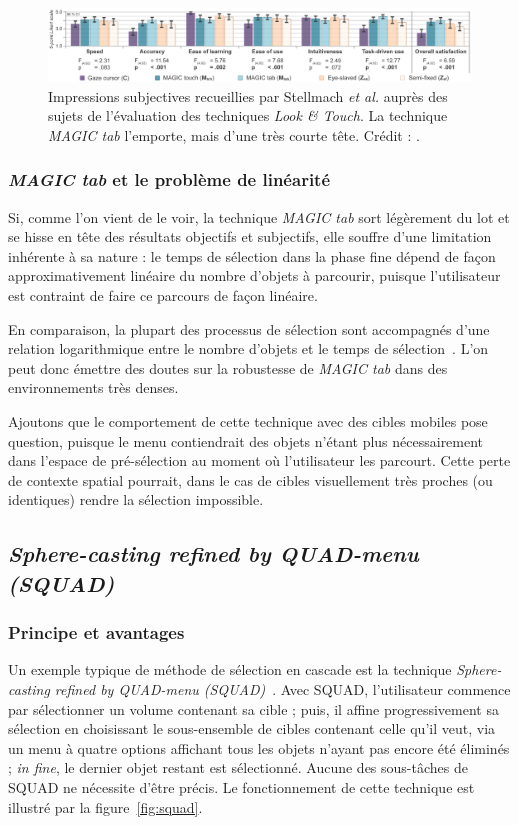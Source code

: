 	\begin{figure}[htb]
		\centering
		\includegraphics[width=\textwidth]{figures/ch2/latSubj}
		\caption[\emph{Look \&{} Touch -- impressions subjectives}]{Impressions subjectives recueillies par Stellmach \emph{et al.} auprès des sujets de l'évaluation des techniques \emph{Look \&{} Touch}. La technique \emph{MAGIC tab} l'emporte, mais d'une très courte tête. Crédit : \cite{stellmach2012look}.}
		\label{fig:latSubj}
	\end{figure}
	
	\subsubsection{\emph{MAGIC tab} et le problème de linéarité}
	Si, comme l'on vient de le voir, la technique \emph{MAGIC tab} sort légèrement du lot et se hisse en tête des résultats objectifs et subjectifs, elle souffre d'une limitation inhérente à sa nature : le temps de sélection dans la phase fine dépend de façon approximativement linéaire du nombre d'objets à parcourir, puisque l'utilisateur est contraint de faire ce parcours de façon linéaire.
	
	En comparaison, la plupart des processus de sélection sont accompagnés d'une relation logarithmique entre le nombre d'objets et le temps de sélection~\cite{hick1952rate, hyman1953stimulus}. L'on peut donc émettre des doutes sur la robustesse de \emph{MAGIC tab} dans des environnements très denses.
	
	Ajoutons que le comportement de cette technique avec des cibles mobiles pose question, puisque le menu contiendrait des objets n'étant plus nécessairement dans l'espace de pré-sélection au moment où l'utilisateur les parcourt. Cette perte de contexte spatial pourrait, dans le cas de cibles visuellement très proches (ou identiques) rendre la sélection impossible.
	
	\subsection{\emph{Sphere-casting refined by QUAD-menu
(SQUAD)}}
	\subsubsection{Principe et avantages}
	Un exemple typique de méthode de sélection en cascade est la technique \emph{Sphere-casting refined by QUAD-menu
(SQUAD)}~\cite{kopper2011rapid}. Avec SQUAD, l'utilisateur commence par sélectionner un volume contenant sa cible ; puis, il affine progressivement sa sélection en choisissant le sous-ensemble de cibles contenant celle qu'il veut, via un menu à quatre options affichant tous les objets n'ayant pas encore été éliminés ; \emph{in fine}, le dernier objet restant est sélectionné. Aucune des sous-tâches de SQUAD ne nécessite d'être précis. Le fonctionnement de cette technique est illustré par la figure~\ref{fig:squad}.


